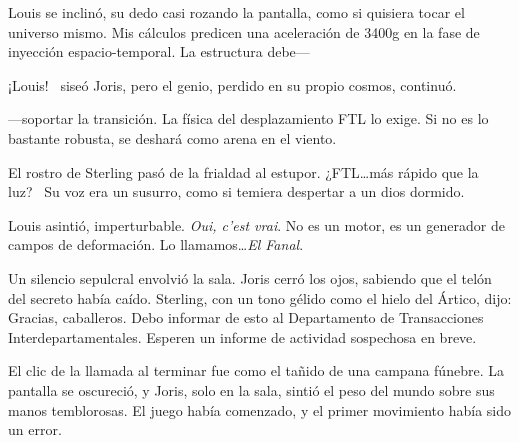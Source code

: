Louis se inclinó, su dedo casi rozando la pantalla, como si quisiera tocar el universo mismo. \glqq Mis cálculos predicen una aceleración de 3400g en la fase de inyección espacio-temporal. La estructura debe---\grqq

\glqq ¡Louis!\grqq~ siseó Joris, pero el genio, perdido en su propio cosmos, continuó.

\glqq ---soportar la transición. La física del desplazamiento FTL lo exige. Si no es lo bastante robusta, se deshará como arena en el viento.\grqq

El rostro de Sterling pasó de la frialdad al estupor. \glqq ¿FTL\ldots más rápido que la luz?\grqq~ Su voz era un susurro, como si temiera despertar a un dios dormido.

Louis asintió, imperturbable. \glqq \emph{Oui, c’est vrai}. No es un motor, es un generador de campos de deformación. Lo llamamos\ldots \emph{El Fanal}.\grqq

Un silencio sepulcral envolvió la sala. Joris cerró los ojos, sabiendo que el telón del secreto había caído. Sterling, con un tono gélido como el hielo del Ártico, dijo: \glqq Gracias, caballeros. Debo informar de esto al Departamento de Transacciones Interdepartamentales. Esperen un informe de actividad sospechosa en breve.\grqq

El clic de la llamada al terminar fue como el tañido de una campana fúnebre. La pantalla se oscureció, y Joris, solo en la sala, sintió el peso del mundo sobre sus manos temblorosas. El juego había comenzado, y el primer movimiento había sido un error.
